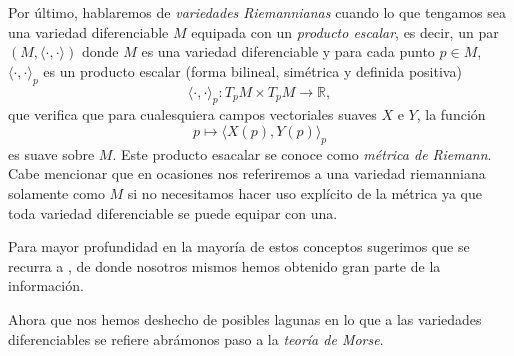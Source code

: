 Por último, hablaremos de \textit{variedades Riemannianas} cuando lo que tengamos sea una variedad diferenciable $M$ equipada con un \textit{producto escalar}, es decir, un par $(M,\langle\cdot,\cdot\rangle)$ donde $M$ es una variedad diferenciable y para cada punto $p \in M$, $\langle\cdot,\cdot\rangle_p$ es un producto escalar (forma bilineal, simétrica y definida positiva)
  \[
    \langle\cdot,\cdot\rangle_p \colon T_pM \times T_pM \to \mathbb{R},
  \]
que verifica que para cualesquiera campos vectoriales suaves $X$ e $Y$, la función
  \[
    p \mapsto \langle X(p), Y(p) \rangle_p
  \]
es suave sobre $M$. Este producto esacalar se conoce como \textit{métrica de Riemann}. Cabe mencionar que en ocasiones nos referiremos a una variedad riemanniana solamente como $M$ si no necesitamos hacer uso explícito de la métrica ya que toda variedad diferenciable se puede equipar con una.

\bigskip

Para mayor profundidad en la mayoría de estos conceptos sugerimos que se recurra a \cite{GonzalezPrietoVariedades}, de donde nosotros mismos hemos obtenido gran parte de la información. 

Ahora que nos hemos deshecho de posibles lagunas en lo que a las variedades diferenciables se refiere abrámonos paso a la \textit{teoría de Morse}.